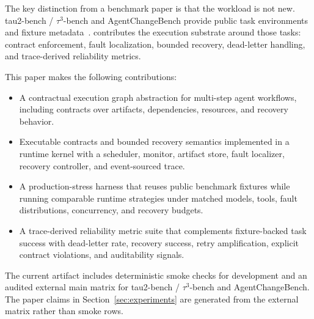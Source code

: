 The key distinction from a benchmark paper is that the workload is not new. tau2-bench / \mbox{$\tau^3$}-bench and AgentChangeBench provide public task environments and fixture metadata~\cite{tau2bench,agentchangebench}. \system contributes the execution substrate around those tasks: contract enforcement, fault localization, bounded recovery, dead-letter handling, and trace-derived reliability metrics.

This paper makes the following contributions:

\begin{itemize}
    \item A contractual execution graph abstraction for multi-step agent workflows, including contracts over artifacts, dependencies, resources, and recovery behavior.
    \item Executable contracts and bounded recovery semantics implemented in a runtime kernel with a scheduler, monitor, artifact store, fault localizer, recovery controller, and event-sourced trace.
    \item A production-stress harness that reuses public benchmark fixtures while running comparable runtime strategies under matched models, tools, fault distributions, concurrency, and recovery budgets.
    \item A trace-derived reliability metric suite that complements fixture-backed task success with dead-letter rate, recovery success, retry amplification, explicit contract violations, and auditability signals.
\end{itemize}

The current artifact includes deterministic smoke checks for development and an audited external main matrix for tau2-bench / \mbox{$\tau^3$}-bench and AgentChangeBench. The paper claims in Section~\ref{sec:experiments} are generated from the external matrix rather than smoke rows.
